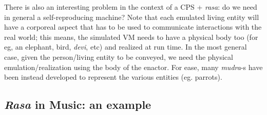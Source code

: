 There is also an interesting problem in the context of a CPS + \textsl{rasa}: do we need in general a self-reproducing machine? Note that each emulated living entity will have a corporeal aspect that has to be used to communicate interactions with the real world; this means, the simulated VM needs to have a physical body too (for eg, an elephant, bird, \textsl{devi}, etc) and realized at run time. In the most general case, given the person/living entity to be conveyed, we need the physical emulation/realization using the body of the enactor. For ease, many \textsl{mudra}-s have been instead developed to represent the various entities (eg. parrots).\\[-20pt]

\subsection{\textsl{Rasa} in Music: an example}\label{chap3-sec4.3}

